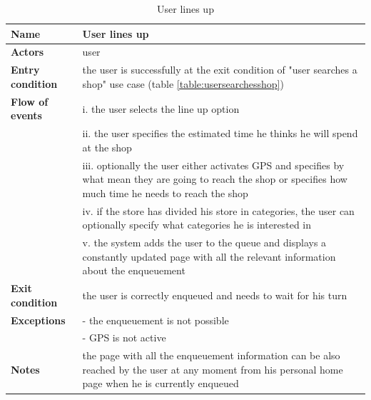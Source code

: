 \begin{table}[h!]
    \centering
    \begin{tabular}{@{}P{0.2\textwidth}P{0.70\textwidth}@{}}
        \toprule
        \textbf{Name}                 & User lines up\\
        \midrule
        \textbf{Actors}               & user\\
        \textbf{Entry condition}      & the user is successfully at the exit condition of "user searches a shop" use case (table \ref{table:usersearchesshop})\\
        \textbf{Flow of events}            
        & i. the user selects the line up option\\
        & ii. the user specifies the estimated time he thinks he will spend at the shop\\
        & iii. optionally the user either activates GPS and specifies by what mean they are going to reach the shop or specifies how much time he needs to reach the shop\\
        & iv. if the store has divided his store in categories, the user can optionally specify what categories he is interested in\\
        & v. the system adds the user to the queue and displays a constantly updated page with all the relevant information about the enqueuement\\
        \textbf{Exit condition}       & the user is correctly enqueued and needs to wait for his turn\\
        \textbf{Exceptions}           
        & - the enqueuement is not possible\\ %
        & - GPS is not active\\
        \textbf{Notes} & the page with all the enqueuement information can be also reached by the user at any moment from his personal home page when he is currently enqueued\\
        \bottomrule
    \end{tabular}
\caption{User lines up}
\label{table:userlinesup}
\end{table}

